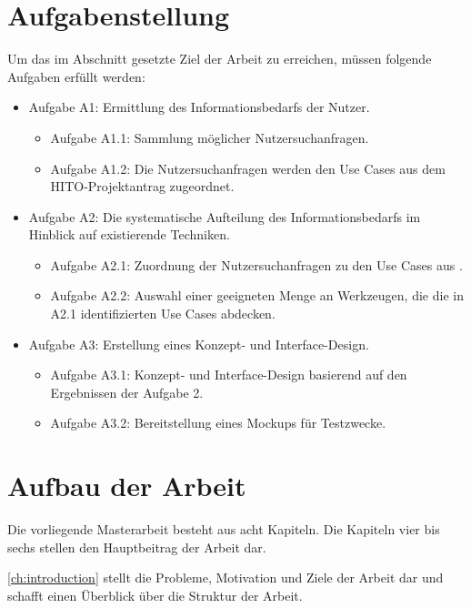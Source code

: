 \section{Aufgabenstellung}\label{sec:aufgabenstellung}

Um das im Abschnitt  gesetzte Ziel der Arbeit zu erreichen, müssen folgende Aufgaben erfüllt werden:

\begin{itemize}
	\item Aufgabe A1: Ermittlung des Informationsbedarfs der Nutzer.
		\begin{itemize}
		\item Aufgabe A1.1: Sammlung möglicher Nutzersuchanfragen.
		\item Aufgabe A1.2: Die Nutzersuchanfragen werden den Use Cases aus dem HITO-Projektantrag zugeordnet.
		\end{itemize}
	\item Aufgabe A2: Die systematische Aufteilung des Informationsbedarfs im Hinblick auf existierende Techniken.
		\begin{itemize}
		\item Aufgabe A2.1: Zuordnung der Nutzersuchanfragen zu den Use Cases aus \citet{linkeddatavisualization}.
		\item Aufgabe A2.2: Auswahl einer geeigneten Menge an Werkzeugen, die die in A2.1 identifizierten Use Cases abdecken.
		\end{itemize}
	\item Aufgabe A3: Erstellung eines Konzept- und Interface-Design.
		\begin{itemize}
		\item Aufgabe A3.1: Konzept- und Interface-Design basierend auf den Ergebnissen der Aufgabe 2.
		\item Aufgabe A3.2: Bereitstellung eines Mockups für Testzwecke.
		\end{itemize}
\end{itemize}

\section{Aufbau der Arbeit}\label{sec:aufbau}

Die vorliegende Masterarbeit besteht aus acht Kapiteln. Die Kapiteln vier bis sechs stellen den Hauptbeitrag der Arbeit dar. \newline

\cref{ch:introduction} stellt die Probleme, Motivation und Ziele der Arbeit dar und schafft einen Überblick über die Struktur der Arbeit. \newline

